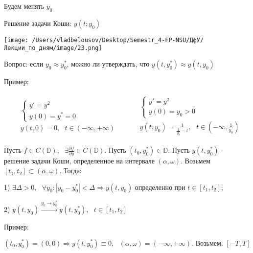 \documentclass[12pt, a4paper]{report}
\begin{document}
Будем менять \( y_0 \)

Решение задачи Коши: \( y (t; y_0) \) 

\begin{center}
    \texttt{[image: /Users/vladbelousov/Desktop/Semestr\_4-FP-NSU/ДфУ/Лекции\_по\_дням/image/23.png]}
\end{center}

Вопрос: если \( y_0 \approx y_0^* \), можно ли утверждать, что \( y(t, y_0 ^* ) \approx y (t, y_0) \) 

Пример: 

\[ \begin{aligned}
    \begin{aligned}
        &\begin{cases}
            y ' = y ^2  \\ 
            y(0 ) = y^* = 0 
        \end{cases} \\
        &y(t, 0 )=0 , \text{ } t \in (-\infty , +\infty )
    \end{aligned}
    \quad \quad  
    \begin{aligned}
        &\begin{cases}
            y ' = y ^2 \\
            y(0) = y_0 > 0
        \end{cases} \\
        &y(t,y_0) = \frac{1 }{\frac{1}{y_0 } -t } , \text{ } t \in  \left( -\infty , \frac{1}{y_0}  \right)
    \end{aligned}
\end{aligned} \] 

\begin{theorem}
    Пусть \( f \in C(\mathbb{D}) , \text{ } \exists \frac{\partial f}{\partial y} \in C(\mathbb{D}) \). Пусть \((t_0, y_0^*) \in \mathbb{D}\). Пусть \( y(t, y_0^*) \) - решение задачи Коши, определенное на интервале \( (\alpha, \omega) \). Возьмем \( [t_1, t_2] \subset (\alpha, \omega) \). Тогда:

    1) \( \exists \Delta > 0 , \text{ }  \forall  y_0 : \left\lvert y_0 - y_0 ^*  \right\rvert < \Delta \Rightarrow y(t, y_0)\)  определенно при \( t \in  [t_1, t_2 ] \); 
    
    2) \( y(t, y_0 ) \xrightarrow{y_0 \to  y_0^* } y(t, y_0^*) , \text{ }  t \in [t_1, t_2 ]  \)
\end{theorem}

Пример: 

\[ (t_0, y_0 ^* ) = (0,0 ) \Rightarrow y (t, y_0 ^* ) \equiv 0 , \text{ } (\alpha , \omega ) = (-\infty , + \infty  ). \text{ Возьмем: } [-T, T]  \] 
\end{document}
